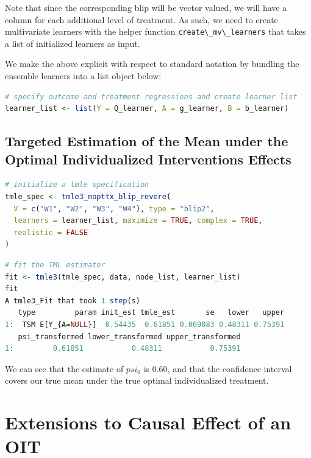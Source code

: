 \documentclass[12pt, krantz2,]{krantz}
\newcommand{\passthrough}[1]{#1}
\theoremstyle{definition}
\theoremstyle{definition}
\theoremstyle{definition}
\newcommand{\1}{\mathbbm{1}}
\begin{document}
Note that since the corresponding blip will be vector valued, we will have a
column for each additional level of treatment. As such, we need to create
multivariate learners with the helper function \passthrough{\lstinline!create\_mv\_learners!} that takes a
list of initialized learners as input.

We make the above explicit with respect to standard notation by bundling the
ensemble learners into a list object below:

\begin{lstlisting}[language=R]
# specify outcome and treatment regressions and create learner list
learner_list <- list(Y = Q_learner, A = g_learner, B = b_learner)
\end{lstlisting}

\hypertarget{targeted-estimation-of-the-mean-under-the-optimal-individualized-interventions-effects-1}{%
\subsection{Targeted Estimation of the Mean under the Optimal Individualized Interventions Effects}\label{targeted-estimation-of-the-mean-under-the-optimal-individualized-interventions-effects-1}}

\begin{lstlisting}[language=R]
# initialize a tmle specification
tmle_spec <- tmle3_mopttx_blip_revere(
  V = c("W1", "W2", "W3", "W4"), type = "blip2",
  learners = learner_list, maximize = TRUE, complex = TRUE,
  realistic = FALSE
)
\end{lstlisting}

\begin{lstlisting}[language=R]
# fit the TML estimator
fit <- tmle3(tmle_spec, data, node_list, learner_list)
fit
A tmle3_Fit that took 1 step(s)
   type         param init_est tmle_est       se   lower   upper
1:  TSM E[Y_{A=NULL}]  0.54435  0.61851 0.069083 0.48311 0.75391
   psi_transformed lower_transformed upper_transformed
1:         0.61851           0.48311           0.75391
\end{lstlisting}

We can see that the estimate of \(psi_0\) is \(0.60\), and that the confidence
interval covers our true mean under the true optimal individualized treatment.

\hypertarget{extensions-to-causal-effect-of-an-oit}{%
\section{Extensions to Causal Effect of an OIT}\label{extensions-to-causal-effect-of-an-oit}}
\end{document}
